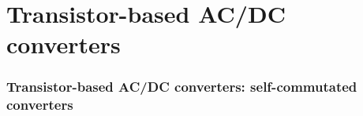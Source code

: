 \section{Transistor-based AC/DC converters}

\begin{frame}
	\frametitle{Transistor-based AC/DC converters: self-commutated converters}
	\begin{columns}
		\begin{column}{0.5\textwidth}
			

\end{column}
\end{columns}
\end{frame}
